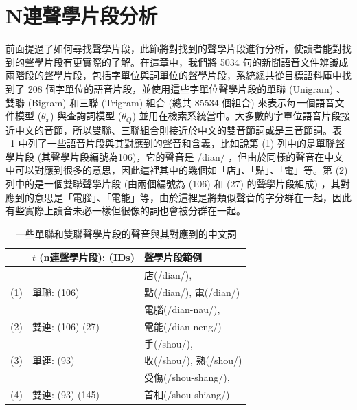 \section{N連聲學片段分析}
\label{sec:acp_exp_setup}
前面提過了如何尋找聲學片段，此節將對找到的聲學片段進行分析，使讀者能對找到的聲學片段有更實際的了解。在這章中，我們將 5034 句的新聞語音文件辨識成兩階段的聲學片段，包括字單位與詞單位的聲學片段，系統總共從目標語料庫中找到了 208 個字單位的語音片段，並使用這些字單位聲學片段的單聯 (Unigram) 、雙聯 (Bigram) 和三聯 (Trigram) 組合 (總共 85534 個組合) 來表示每一個語音文件模型 ($\theta_x$) 與查詢詞模型 ($\theta_Q$)
並用在檢索系統當中。大多數的字單位語音片段接近中文的音節，所以雙聯、三聯組合則接近於中文的雙音節詞或是三音節詞。表 ~\ref{table:chap4_pattern_example} 中列了一些語音片段與其對應到的聲音和含義，比如說第 (1) 列中的是單聯聲學片段 (其聲學片段編號為106)，它的聲音是 /dian/ ，但由於同樣的聲音在中文中可以對應到很多的意思，因此這裡其中的幾個如「店」、「點」、「電」等。第 (2) 列中的是一個雙聯聲學片段 (由兩個編號為 (106) 和 (27) 的聲學片段組成)
，其對應到的意思是「電腦」、「電能」等，由於這裡是將類似聲音的字分群在一起，因此有些實際上讀音未必一樣但很像的詞也會被分群在一起。

\begin{table}[htbp]
\centering
\begin{tabular}{|lll|}
\hline
 & $t$ (n連聲學片段): (IDs) & 聲學片段範例 \\
\hline
 & &  店(/dian/), \\
(1) & 單聯: (106) & 點(/dian/), 電(/dian/) \\
\hline 
 &  & 電腦(/dian-nau/), \\
(2) & 雙連: (106)-(27) & 電能(/dian-neng/) \\
\hline
 & & 手(/shou/), \\
(3) & 單連: (93) &  收(/shou/), 熟(/shou/)\\ 
\hline
 & & 受傷(/shou-shang/), \\
(4) & 雙連: (93)-(145) &  首相(/shou-shiang/) \\
\hline

\end{tabular}
\caption{一些單聯和雙聯聲學片段的聲音與其對應到的中文詞}
\label{table:chap4_pattern_example}
\end{table}



